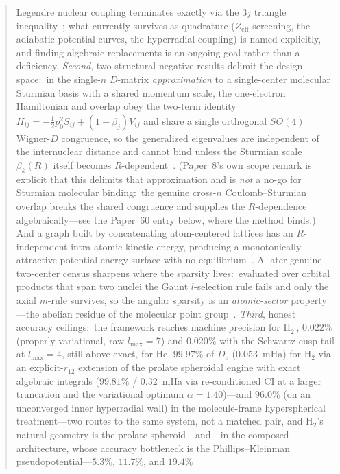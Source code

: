\documentclass[aps,pra,twocolumn,superscriptaddress,longbibliography]{revtex4-2}
\newcommand{\gvc}[2]{#2}
\begin{document}
\begin{abstract}
Legendre nuclear coupling terminates exactly via the $3j$ triangle
inequality~\cite{loutey_paper15}; what currently survives as quadrature
($Z_{\mathrm{eff}}$ screening, the adiabatic potential curves, the
hyperradial coupling) is named explicitly, and finding algebraic
replacements is an ongoing goal rather than a deficiency.
\emph{Second}, two structural negative results delimit the
design space:\ in the single-$n$ $D$-matrix \emph{approximation} to a
single-center molecular Sturmian basis with a shared momentum scale, the
one-electron Hamiltonian and overlap obey the
two-term identity $H_{ij} = -\tfrac12 p_0^2 S_{ij} + (1-\beta_j)V_{ij}$
and share a single orthogonal $SO(4)$ Wigner-$D$ congruence, so the
generalized eigenvalues are independent of the internuclear distance and
cannot bind unless the Sturmian scale $\beta_k(R)$ itself becomes
$R$-dependent~\cite{loutey_paper8}.  (Paper~8's own scope remark is
explicit that this delimits that approximation and is \emph{not} a no-go
for Sturmian molecular binding:\ the genuine cross-$n$ Coulomb--Sturmian
overlap breaks the shared congruence and supplies the $R$-dependence
algebraically---see the Paper~60 entry below, where the method binds.)
And a graph
built by concatenating atom-centered lattices has an $R$-independent
intra-atomic kinetic energy, producing a monotonically attractive
potential-energy surface with no equilibrium~\cite{loutey_fci_mol}.  A
later genuine two-center census sharpens where the sparsity lives:\ evaluated
over orbital products that span two nuclei the Gaunt $l$-selection rule
fails and only the axial $m$-rule survives, so the angular sparsity is an
\emph{atomic-sector} property---the abelian residue of the molecular
point group~\cite{loutey_paper58}.
\emph{Third}, honest accuracy ceilings:\ the framework reaches
machine precision for $\mathrm{H}_2^+$, \gvc{he-bracket}{$0.022\%$ (properly variational, raw
$l_{\max}=7$) and $0.020\%$ with the Schwartz cusp tail at $l_{\max}=4$,
still above exact, for He}, $99.97\%$ of $D_e$ ($0.053$~mHa) for $\mathrm{H}_2$ via an
explicit-$r_{12}$ extension of the prolate spheroidal engine with exact
algebraic integrals ($99.81\%$ / $0.32$~mHa via re-conditioned CI at a
larger truncation and the variational optimum $\alpha = 1.40$)---and $96.0\%$ (on an
unconverged inner hyperradial wall) in
the molecule-frame hyperspherical treatment---two routes to the same
system, not a matched pair, and $\mathrm{H}_2$'s natural geometry is the
prolate spheroid---and---in the
composed architecture, whose accuracy bottleneck is the
Phillips--Kleinman pseudopotential---$5.3\%$, $11.7\%$, and $19.4\%$

\end{abstract}
\end{document}
